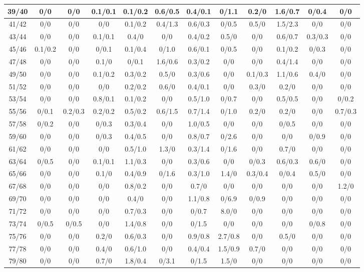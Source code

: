 \begin{table*}[htb]
\begin{tabular}{|c| c c c c c c c c c c c |}
39/40&0/0& 0/0& 0.1/0.1& 0.1/0.2& 0.6/0.5& 0.4/0.1& 0/1.1& 0.2/0& 1.6/0.7& 0/0.4& 0/0\\\hline
41/42&0/0& 0/0& 0/0& 0.1/0.2& 0.4/1.3& 0.6/0.3& 0/0.5& 0.5/0& 1.5/2.3& 0/0& 0/0\\\hline
43/44&0/0& 0/0& 0.1/0.1& 0.4/0& 0/0& 0.4/0.2& 0.5/0& 0/0& 0.6/0.7& 0.3/0.3& 0/0\\\hline
45/46&0.1/0.2& 0/0& 0/0.1& 0.1/0.4& 0/1.0& 0.6/0.1& 0/0.5& 0/0& 0.1/0.2& 0/0.3& 0/0\\\hline
47/48&0/0& 0/0& 0.1/0& 0/0.1& 1.6/0.6& 0.3/0.2& 0/0& 0/0& 0.4/1.4& 0/0& 0/0\\\hline
49/50&0/0& 0/0& 0.1/0.2& 0.3/0.2& 0.5/0& 0.3/0.6& 0/0& 0.1/0.3& 1.1/0.6& 0.4/0& 0/0\\\hline
51/52&0/0& 0/0& 0/0& 0.2/0.2& 0.6/0& 0.4/0.1& 0/0& 0.3/0& 0.2/0& 0/0& 0/0\\\hline
53/54&0/0& 0/0& 0.8/0.1& 0.1/0.2& 0/0& 0.5/1.0& 0/0.7& 0/0& 0.5/0.5& 0/0& 0/0.2\\\hline
55/56&0/0.1& 0.2/0.3& 0.2/0.2& 0.5/0.2& 0.6/1.5& 0.7/1.4& 0/1.0& 0.2/0& 0.2/0& 0/0& 0.7/0.3\\\hline
57/58&0/0.2& 0/0& 0/0.3& 0.3/0.4& 0/0& 1.0/0.5& 0/0& 0/0& 0/0.5& 0/0& 0/0\\\hline
59/60&0/0& 0/0& 0/0.3& 0.4/0.5& 0/0& 0.8/0.7& 0/2.6& 0/0& 0/0& 0/0.9& 0/0\\\hline
61/62&0/0& 0/0& 0/0& 0.5/1.0& 1.3/0& 0.3/1.4& 0/1.6& 0/0& 0.7/0& 0/0& 0/0\\\hline
63/64&0/0.5& 0/0& 0.1/0.1& 1.1/0.3& 0/0& 0.3/0.6& 0/0& 0/0.3& 0.6/0.3& 0.6/0& 0/0\\\hline
65/66&0/0& 0/0& 0.1/0& 0.4/0.9& 0/1.6& 0.3/1.0& 1.4/0& 0.3/0.4& 0/0.4& 0.5/0& 0/0\\\hline
67/68&0/0& 0/0& 0/0& 0.8/0.2& 0/0& 0.7/0& 0/0& 0/0& 0/0& 0/0& 1.2/0\\\hline
69/70&0/0& 0/0& 0/0& 0.4/0& 0/0& 1.1/0.8& 0/6.9& 0/0.9& 0/0& 0/0& 0/0\\\hline
71/72&0/0& 0/0& 0/0& 0.7/0.3& 0/0& 0/0.7& 8.0/0& 0/0& 0/0& 0/0& 0/0\\\hline
73/74&0/0.5& 0/0.5& 0/0& 1.4/0.8& 0/0& 0/1.5& 0/0& 0/0& 0/0& 0/0.8& 0/0\\\hline
75/76&0/0& 0/0& 0.2/0& 0.6/0.3& 0/0& 0.9/0.8& 2.7/0.8& 0/0& 0.5/0& 0/0& 0/0\\\hline
77/78&0/0& 0/0& 0.4/0& 0.6/1.0& 0/0& 0.4/0.4& 1.5/0.9& 0.7/0& 0/0& 0/0& 0/0\\\hline
79/80&0/0& 0/0& 0.7/0& 1.8/0.4& 0/3.1& 0/1.5& 1.5/0& 0/0& 0/0& 0/0& 0/0\\\hline

\end{tabular}
\end{table*}
